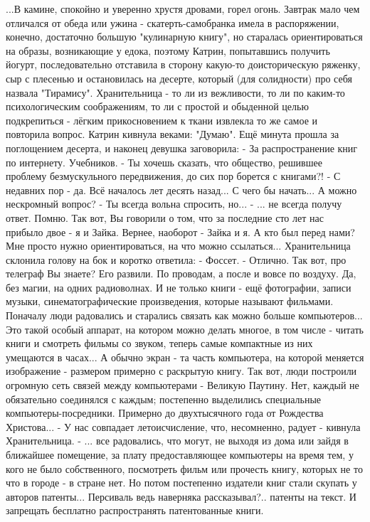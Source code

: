 ...В камине, спокойно и уверенно хрустя дровами, горел огонь. Завтрак мало чем отличался от обеда или ужина - скатерть-самобранка имела в распоряжении, конечно, достаточно большую "кулинарную книгу", но старалась ориентироваться на образы, возникающие у едока, поэтому Катрин, попытавшись получить йогурт, последовательно отставила в сторону какую-то доисторическую ряженку, сыр с плесенью и остановилась на десерте, который (для солидности) про себя назвала "Тирамису". Хранительница - то ли из вежливости, то ли по каким-то психологическим соображениям, то ли с простой и обыденной целью подкрепиться -  лёгким прикосновением к ткани извлекла то же самое и повторила вопрос.
Катрин кивнула веками: "Думаю".
Ещё минута прошла за поглощением десерта, и наконец девушка заговорила:
 - За распространение книг по интернету. Учебников.
 - Ты хочешь сказать, что общество, решившее проблему безмускульного передвижения, до сих пор борется с книгами?!
 - С недавних пор - да. Всё началось лет десять назад... С чего бы начать... А можно нескромный вопрос?
 - Ты всегда вольна спросить, но...
 - ... не всегда получу ответ. Помню. Так вот, Вы говорили о том, что за последние сто лет нас прибыло двое - я и Зайка. Вернее, наоборот - Зайка и я. А кто был перед нами? Мне просто нужно ориентироваться, на что можно ссылаться...
Хранительница склонила голову на бок и коротко ответила:
 - Фоссет.
 - Отлично. Так вот, про телеграф Вы знаете? Его развили. По проводам, а после и вовсе по воздуху. Да, без магии, на одних радиоволнах. И не только книги - ещё фотографии, записи музыки, синематографические произведения, которые называют фильмами. Поначалу люди радовались и старались связать как можно больше компьютеров... Это такой особый аппарат, на котором можно делать многое, в том числе - читать книги и смотреть фильмы со звуком, теперь самые компактные из них умещаются в часах... А обычно экран - та часть компьютера, на которой меняется изображение - размером примерно с раскрытую книгу. Так вот, люди построили огромную сеть связей между компьютерами - Великую Паутину. Нет, каждый не обязательно соединялся с каждым; постепенно выделились специальные компьютеры-посредники.
Примерно до двухтысячного года от Рождества Христова...
 - У нас совпадает летоисчисление, что, несомненно, радует - кивнула Хранительница.
 - ... все радовались, что могут, не выходя из дома или зайдя в ближайшее помещение, за плату предоставляющее компьютеры на время тем, у кого не было собственного, посмотреть фильм или прочесть книгу, которых не то что в городе - в стране нет. Но потом постепенно издатели книг стали скупать у авторов патенты... Персиваль ведь наверняка рассказывал?.. патенты на текст. И запрещать бесплатно распространять патентованные книги.
